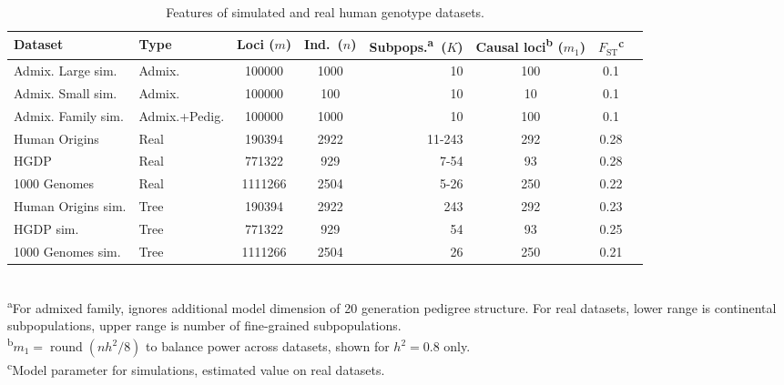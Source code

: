 \documentclass[9pt,lineno]{elife}
\DeclareMathOperator{\round}{round}
\newcommand{\Fst}{F_{\text{ST}}}
\begin{document}
\begin{table}[bt]
  \begin{fullwidth}
    \caption{Features of simulated and real human genotype datasets.}
    \label{tab:human_sum}
    \begin{tabular}{llSSrSSS}
      \toprule
      Dataset & Type & {Loci ($m$)} & {Ind.~($n$)} & {Subpops.\textsuperscript{a}~($K$)} & {Causal loci\textsuperscript{b} ($m_1$)} & $\Fst$\textsuperscript{c} \\
      \midrule
      Admix. Large sim.	&Admix.		&100000		&1000	&10	&100	&0.1 \\
      Admix. Small sim.	&Admix.		&100000		&100	&10	&10	&0.1 \\
      Admix. Family sim.	&Admix.+Pedig.	&100000		&1000	&10	&100	&0.1 \\
      Human Origins	&Real		&190394		&2922	&11-243	&292	&0.28 \\
      HGDP		&Real		&771322		&929	&7-54	&93	&0.28 \\
      1000 Genomes	&Real		&1111266	&2504	&5-26	&250	&0.22 \\
      Human Origins sim.	&Tree		&190394		&2922	&243	&292	&0.23 \\
      HGDP sim.		&Tree		&771322		&929	&54	&93	&0.25 \\
      1000 Genomes sim.	&Tree		&1111266	&2504	&26	&250	&0.21 \\
      \bottomrule
    \end{tabular}
    \\
    \textsuperscript{a}For admixed family, ignores additional model dimension of 20 generation pedigree structure.
    For real datasets, lower range is continental subpopulations, upper range is number of fine-grained subpopulations.\\
    \textsuperscript{b}$m_1 = \round( n h^2 / 8 )$ to balance power across datasets, shown for $h^2=0.8$ only.\\
    \textsuperscript{c}Model parameter for simulations, estimated value on real datasets.
  \end{fullwidth}
\end{table}
\end{document}
